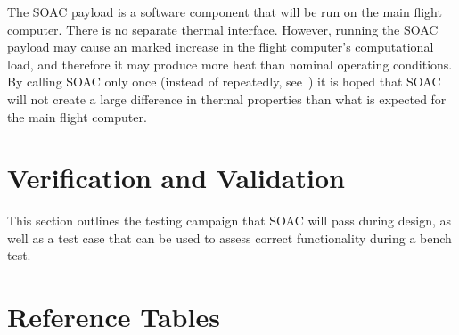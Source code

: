 \documentclass[10pt]{article}
\begin{document}
The SOAC payload is a software component that will be run on the main flight computer. There is no separate thermal interface. However, running the SOAC payload may cause an marked increase in the flight computer's computational load, and therefore it may produce more heat than nominal operating conditions. By calling SOAC only once (instead of repeatedly, see~) it is hoped that SOAC will not create a large difference in thermal properties than what is expected for the main flight computer.

\section{Verification and Validation}\label{sec:v_and_v}

This section outlines the testing campaign that SOAC will pass during design, as well as a test case that can be used to assess correct functionality during a bench test. 




\clearpage
\section*{Reference Tables}
\end{document}
